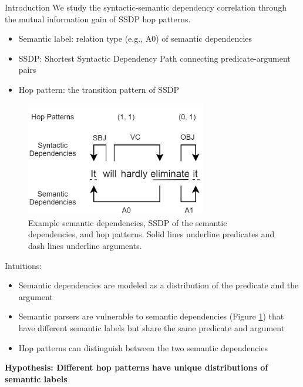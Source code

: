 \begin{block}{Introduction}
We study the syntactic-semantic dependency correlation through the mutual information gain of SSDP hop patterns.
\begin{itemize}
    \vspace{-0.8cm}
    \item Semantic label: relation type (e.g., A0) of semantic dependencies
    \item SSDP: Shortest Syntactic Dependency Path connecting predicate-argument pairs
    \item Hop pattern: the transition pattern of SSDP
\end{itemize}
\begin{figure}
    \centering
    \captionsetup{justification=centering}
    \includegraphics[width=0.7\textwidth]{images/syn-sem-dep-example.png}
    \caption{Example semantic dependencies, SSDP of the semantic dependencies, and hop patterns. Solid lines underline predicates and dash lines underline arguments.}
    \label{fig:syn-sem example}
\end{figure}
Intuitions:
\begin{itemize}
\vspace{-1cm}
    \item Semantic dependencies are modeled as a distribution of the predicate and the argument \cite{dozat-manning-2018-simpler, strubell-etal-2018-linguistically, he-etal-2018-syntax}
    \item Semantic parsers are vulnerable to semantic dependencies (Figure \ref{fig:syn-sem example}) that have different semantic labels but share the same predicate and argument
    \item Hop patterns can distinguish between the two semantic dependencies
\end{itemize}

\textbf{Hypothesis: Different hop patterns have unique distributions of semantic labels}


\end{block}